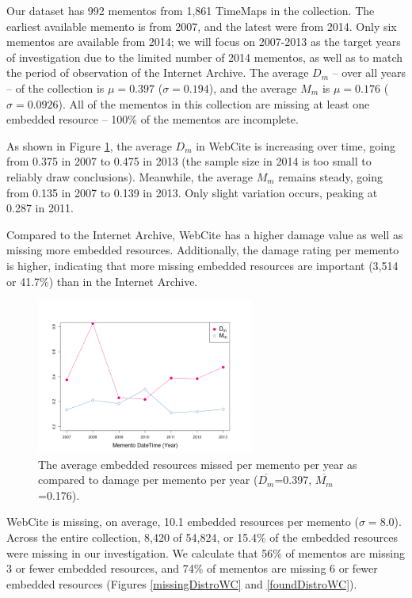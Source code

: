 Our dataset has 992 mementos from 1,861 TimeMaps in the collection. The earliest available memento is from 2007, and the latest were from 2014. Only six mementos are available from 2014; we will focus on 2007-2013 as the target years of investigation due to the limited number of 2014 mementos, as well as to match the period of observation of the Internet Archive. The average $D_m$ -- over all years -- of the collection is $\mu=0.397$ ($\sigma=0.194$), and the average  $M_m$ is $\mu=0.176$ ($\sigma=0.0926$). All of the mementos in this collection are missing at least one embedded resource -- 100\% of the mementos are incomplete. 

As shown in Figure \ref{missingByYearWC}, the average $D_m$ in WebCite is increasing over time, going from 0.375 in 2007 to 0.475 in 2013 (the sample size in 2014 is too small to reliably draw conclusions). Meanwhile, the average $M_m$ remains steady, going from 0.135 in 2007 to 0.139 in 2013. Only slight variation occurs, peaking at 0.287 in 2011. 

Compared to the Internet Archive, WebCite has a higher damage value as well as missing more embedded resources. Additionally, the damage rating per memento is higher, indicating that more missing embedded resources are important (3,514 or 41.7\%) than in the Internet Archive.

\begin{figure}[h!]
\includegraphics[width=270px]{./imgs/MissedAndDamagePerYear_webcite.png}
\caption{The average embedded resources missed per memento per year as compared to damage per memento per year ($\overline{D_m}$=0.397, $\overline{M_m}$=0.176).}
\label{missingByYearWC}
\end{figure}

WebCite is missing, on average, 10.1 embedded resources per memento ($\sigma=8.0$). Across the entire collection, 8,420 of 54,824, or 15.4\% of the embedded resources were missing in our investigation. We calculate that 56\% of mementos are missing 3 or fewer embedded resources, and 74\% of mementos are missing 6 or fewer embedded resources (Figures \ref{missingDistroWC} and \ref{foundDistroWC}).

